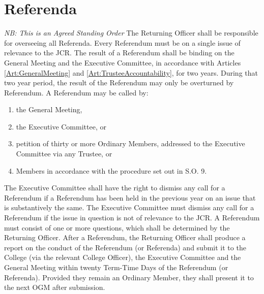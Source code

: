 \chapter{Referenda}
\hspace*{-10pt}\textit{NB: This is an Agreed Standing Order}
\npara The Returning Officer shall be responsible for overseeing all Referenda.
\npara Every Referendum must be on a single issue of relevance to the JCR.  The result of a Referendum shall be binding on the General Meeting and the Executive Committee, in accordance with Articles \ref{Art:GeneralMeeting} and \ref{Art:TrusteeAccountability}, for two years.  During that two year period, the result of the Referendum may only be overturned by Referendum.
\npara A Referendum may be called by:
\begin{enumerate}
\item the General Meeting,
\item the Executive Committee, or
\item petition of thirty or more Ordinary Members, addressed to the Executive Committee via any Trustee, or
\item Members in accordance with the procedure set out in S.O. 9.
\end{enumerate}
\npara The Executive Committee shall have the right to dismiss any call for a Referendum if a Referendum has been held in the previous year on an issue that is substantively the same.  The Executive Committee must dismiss any call for a Referendum if the issue in question is not of relevance to the JCR.
\npara A Referendum must consist of one or more questions, which shall be determined by the Returning Officer.  After a Referendum, the Returning Officer shall produce a report on the conduct of the Referendum (or Referenda) and submit it to the College (via the relevant College Officer), the Executive Committee and the General Meeting within twenty Term-Time Days of the Referendum (or Referenda).  Provided they remain an Ordinary Member, they shall present it to the next OGM after submission.
